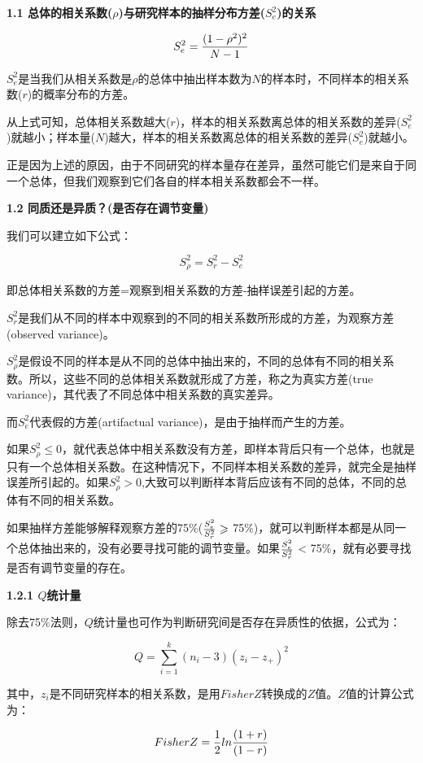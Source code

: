 \documentclass[
]{book}
\begin{document}
\textbf{1.1 总体的相关系数(\(\rho\))与研究样本的抽样分布方差(\(S_{e}^{2}\))的关系}

\[
S_{e}^{2}={{(1-\rho^2)^2}\over{N-1}}
\]

\(S_{e}^{2}\)是当我们从相关系数是\(\rho\)的总体中抽出样本数为\(N\)的样本时，不同样本的相关系数(\(r\))的概率分布的方差。

从上式可知，总体相关系数越大(\(r\))，样本的相关系数离总体的相关系数的差异(\(S_{e}^{2}\))就越小；样本量(\(N\))越大，样本的相关系数离总体的相关系数的差异(\(S_{e}^{2}\))就越小。

正是因为上述的原因，由于不同研究的样本量存在差异，虽然可能它们是来自于同一个总体，但我们观察到它们各自的样本相关系数都会不一样。

\textbf{1.2 同质还是异质？(是否存在调节变量)}

我们可以建立如下公式：

\[
S_{\rho}^{2}=S_{r}^{2}-S_{e}^{2}
\]

即总体相关系数的方差=观察到相关系数的方差-抽样误差引起的方差。

\(S_{r}^{2}\)是我们从不同的样本中观察到的不同的相关系数所形成的方差，为观察方差(observed variance)。

\(S_{\rho}^{2}\)是假设不同的样本是从不同的总体中抽出来的，不同的总体有不同的相关系数。所以，这些不同的总体相关系数就形成了方差，称之为真实方差(true variance)，其代表了不同总体中相关系数的真实差异。

而\(S_{e}^{2}\)代表假的方差(artifactual variance)，是由于抽样而产生的方差。

如果\(S_{\rho}^{2}\leqslant0\)，就代表总体中相关系数没有方差，即样本背后只有一个总体，也就是只有一个总体相关系数。在这种情况下，不同样本相关系数的差异，就完全是抽样误差所引起的。如果\(S_{\rho}^{2}>0\),大致可以判断样本背后应该有不同的总体，不同的总体有不同的相关系数。

如果抽样方差能够解释观察方差的75\%(\({{S_{e}^{2}}\over{S_{r}^{2}}}\geqslant\) 75\%)，就可以判断样本都是从同一个总体抽出来的，没有必要寻找可能的调节变量。如果\({{S_{e}^{2}}\over{S_{r}^{2}}}\) \textless{} 75\%，就有必要寻找是否有调节变量的存在。

\textbf{1.2.1 \(Q\)统计量}

除去75\%法则，\(Q\)统计量也可作为判断研究间是否存在异质性的依据，公式为：

\[
Q=\sum_{i=1}^{k}(n_{i}-3)(z_{i}-z_{+})^{2}
\]

其中，\(z_{i}\)是不同研究样本的相关系数，是用\(FisherZ\)转换成的\(Z\)值。\(Z\)值的计算公式为：

\[
FisherZ={1\over2}ln{{(1+r)}\over{(1-r)}}
\]
\end{document}
